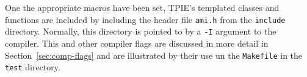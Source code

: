 One the appropriate macros have been set, TPIE's templated classes and
functions are included by including the header file {\tt ami.h} from
the {\tt include} directory.  Normally, this directory is pointed to
by a {\tt -I} argument to the compiler.  This and other compiler flags
are discussed in more detail in Section~\ref{sec:comp-flags} and are
illustrated by their use un the {\tt Makefile} in the
{\tt test} directory.
 





